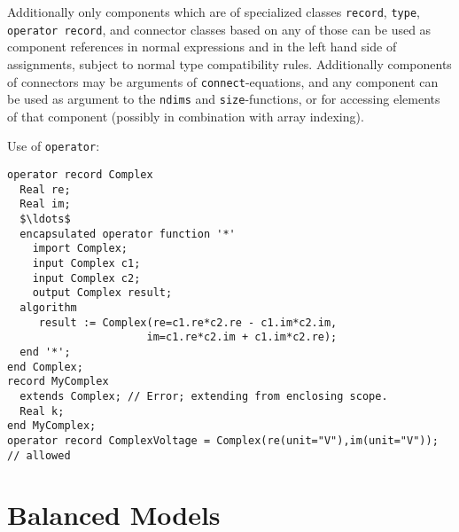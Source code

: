 Additionally only components which are of specialized classes \lstinline!record!, \lstinline!type!, \lstinline!operator record!, and connector classes based on any of those can be used as component references in normal expressions and in the left hand side of assignments, subject to normal type compatibility rules.
Additionally components of connectors may be arguments of \lstinline!connect!-equations, and any component can be used as argument to the \lstinline!ndims! and \lstinline!size!-functions, or for accessing elements of that component (possibly in combination with array indexing).

\begin{example}
Use of \lstinline!operator!:
\begin{lstlisting}[language=modelica]
operator record Complex
  Real re;
  Real im;
  $\ldots$
  encapsulated operator function '*'
    import Complex;
    input Complex c1;
    input Complex c2;
    output Complex result;
  algorithm
     result := Complex(re=c1.re*c2.re - c1.im*c2.im,
                      im=c1.re*c2.im + c1.im*c2.re);
  end '*';
end Complex;
record MyComplex
  extends Complex; // Error; extending from enclosing scope.
  Real k;
end MyComplex;
operator record ComplexVoltage = Complex(re(unit="V"),im(unit="V")); // allowed
\end{lstlisting}
\end{example}

\section{Balanced Models}\label{balanced-models}

